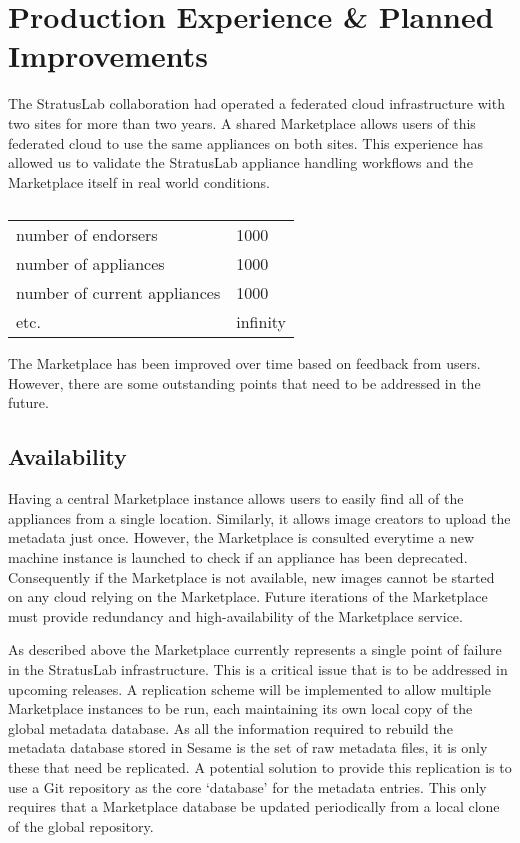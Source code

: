 \section{Production Experience \& Planned Improvements}
\label{sec:production}

The StratusLab collaboration had operated a federated cloud
infrastructure with two sites for more than two years.  A shared
Marketplace allows users of this federated cloud to use the same
appliances on both sites.  This experience has allowed us to validate
the StratusLab appliance handling workflows and the Marketplace itself
in real world conditions.

\begin{table}
\caption{}
\label{tab:statistics}
\begin{center}
\begin{tabular}{ll}
\hline
number of endorsers & 1000 \\
number of appliances & 1000 \\
number of current appliances & 1000 \\
etc. & infinity \\
\hline
\end{tabular}
\end{center}
\end{table}

The Marketplace has been improved over time based on feedback from
users.  However, there are some outstanding points that need to be
addressed in the future.

\subsection{Availability}

Having a central Marketplace instance allows users to easily find all
of the appliances from a single location.  Similarly, it allows image
creators to upload the metadata just once.  However, the Marketplace
is consulted everytime a new machine instance is launched to check if
an appliance has been deprecated.  Consequently if the Marketplace is
not available, new images cannot be started on any cloud relying on
the Marketplace\@.  Future iterations of the Marketplace must provide
redundancy and high-availability of the Marketplace service. 

As described above the Marketplace currently represents a single point
of failure in the StratusLab infrastructure. This is a critical issue
that is to be addressed in upcoming releases. A replication scheme
will be implemented to allow multiple Marketplace instances to be run,
each maintaining its own local copy of the global metadata
database. As all the information required to rebuild the metadata
database stored in Sesame is the set of raw metadata files, it is only
these that need be replicated. A potential solution to provide this
replication is to use a Git repository as the core `database' for the
metadata entries. This only requires that a Marketplace database be
updated periodically from a local clone of the global repository.

